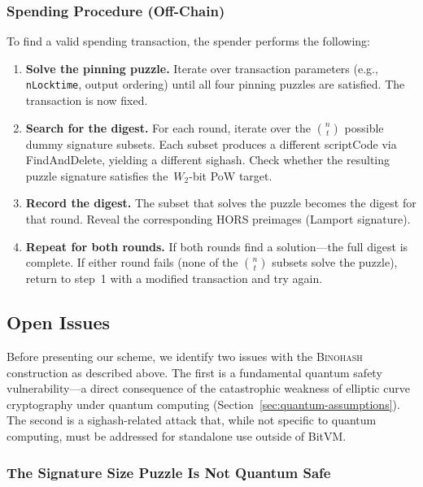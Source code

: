 \documentclass[11pt, a4paper]{article}
\begin{document}
\subsubsection{Spending Procedure (Off-Chain)}

To find a valid spending transaction, the spender performs the following:

\begin{enumerate}
    \item \textbf{Solve the pinning puzzle.} Iterate over transaction parameters (e.g., \texttt{nLocktime}, output ordering) until all four pinning puzzles are satisfied. The transaction is now fixed.

    \item \textbf{Search for the digest.} For each round, iterate over the $\binom{n}{t}$ possible dummy signature subsets. Each subset produces a different scriptCode via FindAndDelete, yielding a different sighash. Check whether the resulting puzzle signature satisfies the~$W_2$-bit PoW target.

    \item \textbf{Record the digest.} The subset that solves the puzzle becomes the digest for that round. Reveal the corresponding HORS preimages (Lamport signature).

    \item \textbf{Repeat for both rounds.} If both rounds find a solution---the full digest is complete. If either round fails (none of the $\binom{n}{t}$ subsets solve the puzzle), return to step~1 with a modified transaction and try again.
\end{enumerate}

\subsection{Open Issues}
\label{sec:open-issues}

Before presenting our scheme, we identify two issues with the \textsc{Binohash} construction as described above. The first is a fundamental quantum safety vulnerability---a direct consequence of the catastrophic weakness of elliptic curve cryptography under quantum computing (Section~\ref{sec:quantum-assumptions}). The second is a sighash-related attack that, while not specific to quantum computing, must be addressed for standalone use outside of BitVM.

\subsubsection{The Signature Size Puzzle Is Not Quantum Safe}
\label{sec:quantum-vulnerability}
\end{document}
